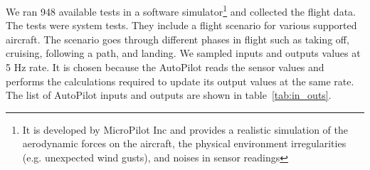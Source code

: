 We ran 948 available tests in a software simulator\footnote{It is developed by MicroPilot Inc and provides a realistic simulation of the aerodynamic  forces on the aircraft, the physical environment irregularities (e.g. unexpected wind gusts), and noises in sensor readings} and collected the flight data. The tests were system tests. They include a flight scenario for various supported aircraft. The scenario goes through different phases in flight such as taking off, cruising, following a path, and landing.
We sampled inputs and outputs values at 5 Hz rate.
It is chosen because the AutoPilot reads the sensor values and performs the calculations required to update its output values at the same rate.
The list of AutoPilot inputs and outputs are shown in table~\ref{tab:in_outs}.



